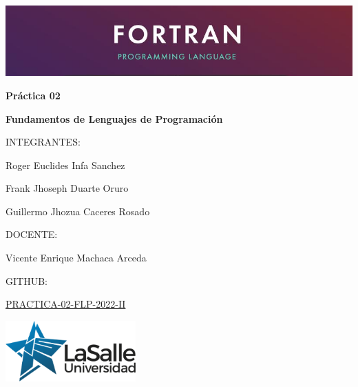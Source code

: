 \pagecolor{white}\afterpage{\nopagecolor}


\includegraphics[width=20cm]{images/for.png}
\vspace{0.25in}

\begin{singlespace}
\fontsize{70}{75}\selectfont \textcolor{FSBlue}{\textbf{Práctica 02}}

\vspace{10mm}
\LARGE\textcolor{FSBlue}{\textbf{Fundamentos de Lenguajes de Programación}}

\vspace{0.5in}

\Large\textcolor{FSBlue}{INTEGRANTES:}

\Large\textcolor{FSBlue}{Roger Euclides Infa Sanchez}

\Large\textcolor{FSBlue}{Frank Jhoseph Duarte Oruro}

\Large\textcolor{FSBlue}{Guillermo Jhozua Caceres Rosado}

\vspace{0.2in}

\Large\textcolor{FSBlue}{DOCENTE:}

\Large\textcolor{FSBlue}{Vicente Enrique Machaca Arceda}

\vspace{0.2in}

\Large\textcolor{FSBlue}{GITHUB:}

\Large\textcolor{FSBlue}{\href{https://github.com/rinfasulasalle/PRACTICA-02-FLP-2022-II}{PRACTICA-02-FLP-2022-II}}

\includegraphics[width=5cm, right]{images/fslogo.png}
\end{singlespace}

\thispagestyle{empty}
\restoregeometry   
\newpage